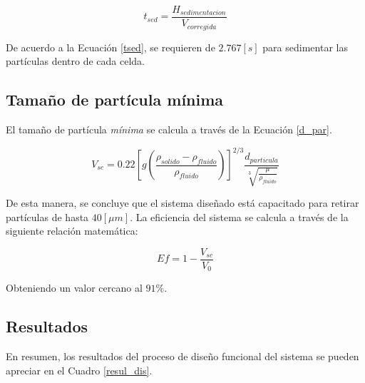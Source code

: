 \begin{equation}
	t_{sed} = \frac{H_{sedimentacion}}{V_{corregida}}
	\label{tsed}
\end{equation}

\noindent
\justify

De acuerdo a la Ecuaci\'on \ref{tsed}, se requieren de $2.767 [s]$ para sedimentar las part\'iculas dentro de cada celda.

\subsection{Tama\~no de part\'icula m\'inima}

\noindent
\justify

El tama\~no de part\'icula \textit{m\'inima} se calcula a trav\'es de la Ecuaci\'on \ref{d_par}.

\begin{equation}
	V_{sc} = 0.22 \left[g \left( \frac{\rho _{solido} - \rho _{fluido}}{\rho _{fluido}} \right) \right] ^{2/3} \frac{d_{particula}}{\sqrt[3]{\frac{\mu}{\rho _{fluido}}}}
	\label{d_par}
\end{equation}

\noindent
\justify

De esta manera, se concluye que el sistema dise\~nado est\'a capacitado para retirar part\'iculas de hasta $40 [\mu m]$. La eficiencia del sistema se calcula a trav\'es de la siguiente relaci\'on matem\'atica:

\begin{equation}
	Ef = 1 - \frac{V_{sc}}{V_0}
\end{equation} 

\noindent
\justify

Obteniendo un valor cercano al $91 \%$.

\newpage

\subsection{Resultados}

\noindent
\justify

En resumen, los resultados del proceso de dise\~no funcional del sistema se pueden apreciar en el Cuadro \ref{resul_dis}.

